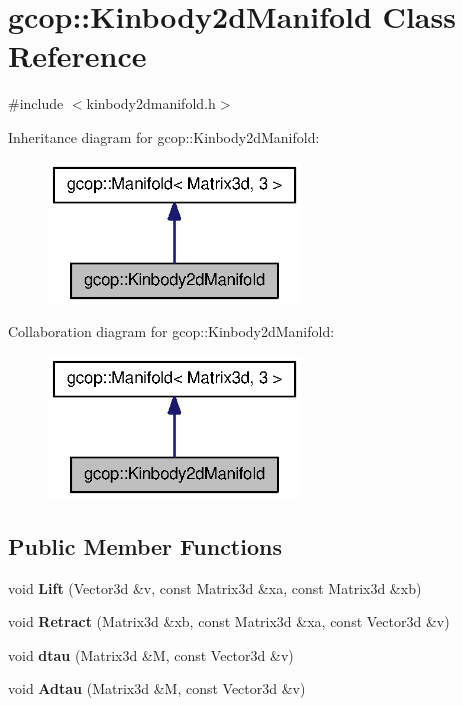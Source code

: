\section{gcop\-:\-:\-Kinbody2d\-Manifold \-Class \-Reference}
\label{classgcop_1_1Kinbody2dManifold}


{\ttfamily \#include $<$kinbody2dmanifold.\-h$>$}



\-Inheritance diagram for gcop\-:\-:\-Kinbody2d\-Manifold\-:
\nopagebreak
\begin{figure}[H]
\begin{center}
\leavevmode
\includegraphics[width=190pt]{classgcop_1_1Kinbody2dManifold__inherit__graph}
\end{center}
\end{figure}


\-Collaboration diagram for gcop\-:\-:\-Kinbody2d\-Manifold\-:
\nopagebreak
\begin{figure}[H]
\begin{center}
\leavevmode
\includegraphics[width=190pt]{classgcop_1_1Kinbody2dManifold__coll__graph}
\end{center}
\end{figure}
\subsection*{\-Public \-Member \-Functions}
\begin{DoxyCompactItemize}
\item 
void {\bf \-Lift} (\-Vector3d \&v, const \-Matrix3d \&xa, const \-Matrix3d \&xb)
\item 
void {\bf \-Retract} (\-Matrix3d \&xb, const \-Matrix3d \&xa, const \-Vector3d \&v)
\item 
void {\bf dtau} (\-Matrix3d \&\-M, const \-Vector3d \&v)
\item 
void {\bf \-Adtau} (\-Matrix3d \&\-M, const \-Vector3d \&v)
\end{DoxyCompactItemize}
